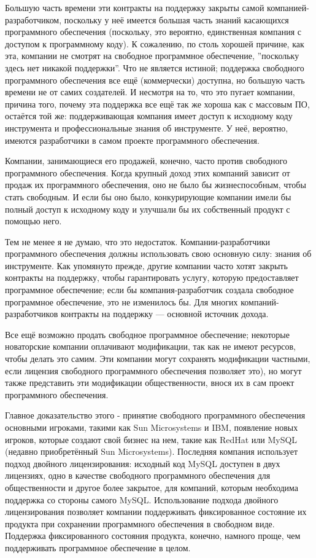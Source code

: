 \documentclass[10pt]{book}
\begin{document}
Большую часть времени эти контракты на поддержку закрыты самой компанией-разработчиком, поскольку у неё имеется большая часть знаний касающихся программного обеспечения (поскольку, это вероятно, единственная компания с доступом к программному коду). К сожалению, по столь хорошей причине, как эта, компании не смотрят на свободное программное обеспечение, ''поскольку здесь нет никакой поддержки''. Что не является истиной; поддержка свободного программного обеспечения все ещё (коммерчески) доступна, но большую часть времени не от самих создателей. И несмотря на то, что это пугает компании, причина того, почему эта поддержка все ещё так же хороша как с массовым ПО, остаётся той же: поддерживающая компания имеет доступ к исходному коду инструмента и профессиональные знания об инструменте. У неё, вероятно, имеются разработчики в самом проекте программного обеспечения.

Компании, занимающиеся его продажей, конечно, часто против свободного программного обеспечения. Когда крупный доход этих компаний зависит от продаж их программного обеспечения, оно не было бы жизнеспособным, чтобы стать свободным. И если бы оно было, конкурирующие компании имели бы полный доступ к исходному коду и улучшали бы их собственный продукт с помощью него.

Тем не менее я не думаю, что это недостаток. Компании-разработчики программного обеспечения должны использовать свою основную силу: знания об инструменте. Как упомянуто прежде, другие компании часто хотят закрыть контракты на поддержку, чтобы гарантировать услугу, которую предоставляет программное обеспечение; если бы компания-разработчик создала свободное программное обеспечение, это не изменилось бы. Для многих компаний-разработчи\-ков контракты на поддержку --- основной источник дохода.

Все ещё возможно продать свободное программное обеспечение; некоторые новаторские компании оплачивают модификации, так как не имеют ресурсов, чтобы делать это самим. Эти компании могут сохранять модификации частными, если лицензия свободного программного обеспечения позволяет это), но могут также представить эти модификации общественности, внося их в сам проект программного обеспечения.

Главное доказательство этого - принятие свободного программного обеспечения основными игроками, такими как Sun Microsystems и IBM, появление новых игроков, которые создают свой бизнес на нем, такие как RedHat или MySQL (недавно приобретённый Sun Microsystems). Последняя компания использует подход двойного лицензирования: исходный код MySQL доступен в двух лицензиях, одно в качестве свободного программного обеспечения для общественности и другое более закрытое, для компаний, которым необходима поддержка со стороны самого MySQL. Использование подхода двойного лицензирования позволяет компании поддерживать фиксированное состояние их продукта при сохранении программного обеспечения в свободном виде. Поддержка фиксированного состояния продукта, конечно, намного проще, чем поддерживать программное обеспечение в целом.
\end{document}
